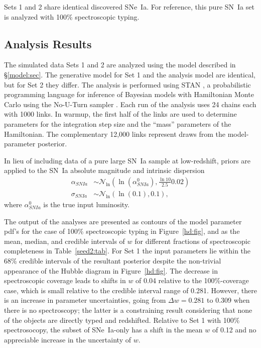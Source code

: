 \documentclass[preprint,3p]{elsarticle}
\begin{document}
Sets 1 and 2 share identical discovered SNe~Ia.  For reference, this pure SN~Ia
set is analyzed with 100\% spectroscopic typing. 


\subsection{Analysis Results}
The simulated data Sets 1 and 2 are analyzed using the model described
in \S\ref{model:sec}.  The generative model for Set 1 and the analysis model are 
identical, but for Set 2 they differ.
The analysis is performed using STAN 
\citep{stan-software:2015},
a probabilistic programming language for
inference of Bayesian models with Hamiltonian Monte Carlo
using the No-U-Turn sampler \citep{Homan:2014:NSA:2627435.2638586}.  Each run of the analysis
uses 24 chains each with 1000 links.  In warmup, the first half of the links are used to
determine parameters for the integration step size and the ``mass''
parameters of the Hamiltonian. The complementary
12,000 links represent draws from the model-parameter posterior.

In lieu of including data of
a pure large SN~Ia sample at low-redshift,
priors are applied to the SN~Ia absolute magnitude and intrinsic dispersion
\begin{align}
\alpha_{SNIa} & \sim \mathcal{N}_{\ln}\left(\ln\left(\alpha^0_{SNIa}\right),\frac{\ln{10}}{2.5}0.02\right)\\
\sigma_{SNIa} & \sim \mathcal{N}_{\ln}\left(\ln\left(0.1\right),0.1\right),
\end{align}
where $\alpha^0_{SNIa}$ is the true input luminosity.


The output of the analyses are presented as contours of the model
parameter pdf's for the case of 100\% spectroscopic
typing in Figure~\ref{hd:fig}, and as the mean, median, and
credible intervals of $w$ for different fractions of
spectroscopic completeness in Table~\ref{seed2:tab}.
For Set 1  the input parameters lie 
within the 68\% credible intervals of the resultant posterior despite the non-trivial appearance of
the Hubble diagram in Figure~\ref{hd:fig}.
The decrease in spectroscopic coverage leads to shifts in $w$ of 0.04 relative to the 100\%-coverage case, which is small
relative to the credible interval range of 0.281.  However, there is an
increase in parameter uncertainties, going from $\Delta w= 0.281$ to 0.309
when there is no spectroscopy; the latter is a constraining result considering that none of the
objects are directly typed and redshifted.
Relative to Set 1 with 100\% spectrosocopy,
the subset of SNe~Ia-only has a shift in the mean $w$ of 0.12
and no appreciable increase in the uncertainty of $w$.
\end{document}
